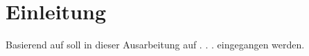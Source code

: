 \section*{Einleitung}

Basierend auf \cite[S.49-55]{humphreys1972introduction} soll in dieser Ausarbeitung auf . . . eingegangen werden. 

